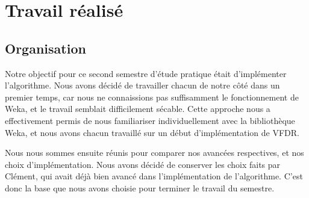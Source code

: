 \section{Travail réalisé}

    \subsection{Organisation} 

        Notre objectif pour ce second semestre d’étude pratique était d’implémenter l’algorithme. Nous avons décidé de travailler chacun de notre côté dans un premier temps, car nous ne connaissions pas suffisamment le fonctionnement de Weka, et le travail semblait difficilement sécable. Cette approche nous a effectivement permis de nous familiariser individuellement avec la bibliothèque Weka, et nous avons chacun travaillé sur un début d’implémentation de VFDR.

        Nous nous sommes ensuite réunis pour comparer nos avancées respectives, et nos choix d’implémentation. Nous avons décidé de conserver les choix faits par Clément, qui avait déjà bien avancé dans l’implémentation de l’algorithme. C’est donc la base que nous avons choisie pour terminer le travail du semestre.

